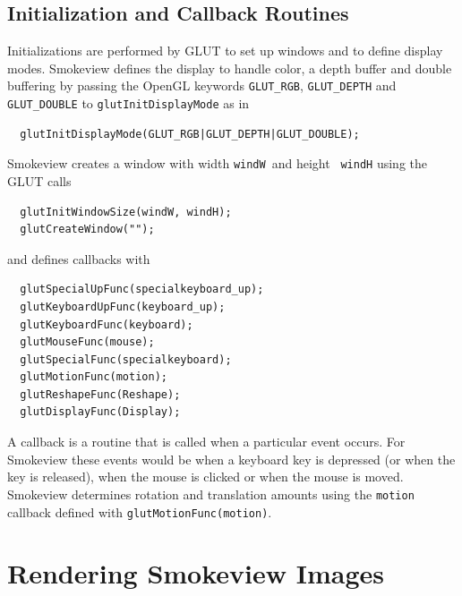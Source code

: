 \documentclass[11pt,twoside]{book}
\begin{document}
%
%

\section{Initialization and Callback Routines}
Initializations are performed by GLUT to set up windows and to
define display modes.  Smokeview defines the display to handle
color, a depth buffer and double buffering by passing the OpenGL
keywords {\tt GLUT\_RGB}, {\tt GLUT\_DEPTH} and {\tt GLUT\_DOUBLE}
to {\tt glutInitDisplayMode} as in

\begin{lstlisting}
  glutInitDisplayMode(GLUT_RGB|GLUT_DEPTH|GLUT_DOUBLE);
\end{lstlisting}

Smokeview creates a window with width {\tt windW}\ and height {\tt
windH} using the GLUT calls

\begin{lstlisting}
  glutInitWindowSize(windW, windH);
  glutCreateWindow("");
\end{lstlisting}

and defines callbacks with

\begin{lstlisting}
  glutSpecialUpFunc(specialkeyboard_up);
  glutKeyboardUpFunc(keyboard_up);
  glutKeyboardFunc(keyboard);
  glutMouseFunc(mouse);
  glutSpecialFunc(specialkeyboard);
  glutMotionFunc(motion);
  glutReshapeFunc(Reshape);
  glutDisplayFunc(Display);
\end{lstlisting}

A callback is a routine that is called when a particular event
occurs.  For Smokeview these events would be when a keyboard key
is depressed (or when the key is released), when the mouse is
clicked or when the mouse is moved.  Smokeview determines rotation
and translation amounts using the {\tt motion} callback defined
with {\tt glutMotionFunc(motion)}.




%
%

\chapter{Rendering Smokeview Images}
\end{document}
